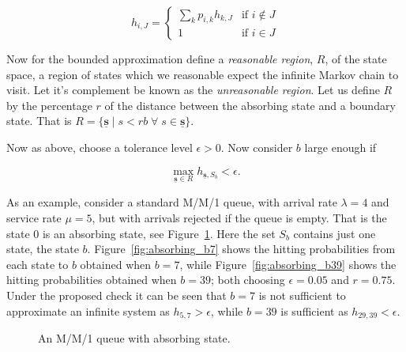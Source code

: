 \documentclass{article}
\begin{document}
\begin{equation}
h_{i, J} = \begin{cases}
\sum_k p_{i, k} h_{k, J} & \text{if } i \notin J \\
1 & \text{if } i \in J
\end{cases}
\end{equation}

Now for the bounded approximation define a \textit{reasonable region}, $R$, of
the state space, a region of states which we reasonable expect the infinite
Markov chain to visit. Let it's complement be known as the \textit{unreasonable
region}.
Let us define $R$ by the percentage $r$ of the distance between the absorbing
state and a boundary state. That is
$R = \{\underline{\mathbf{s}} \;|\; s < rb \;\forall\; s \in \underline{\mathbf{s}}\}$.

Now as above, choose a tolerance level $\epsilon > 0$. Now consider $b$ large
enough if

\begin{equation}
\max_{\underline{\mathbf{s}} \in R} h_{\underline{\mathbf{s}}, S_b} < \epsilon.
\end{equation}

As an example, consider a standard M/M/1 queue, with arrival rate $\lambda = 4$
and service rate $\mu = 5$, but with arrivals rejected if the queue is empty.
That is the state $0$ is an absorbing state, see Figure~\ref{fig:mm1_absorbing}.
Here the set $S_b$ contains just one state, the state $b$.
Figure~\ref{fig:absorbing_b7} shows the hitting probabilities from each state to
$b$ obtained when $b=7$, while Figure~\ref{fig:absorbing_b39} shows the hitting
probabilities obtained when $b=39$; both choosing $\epsilon=0.05$ and $r=0.75$.
Under the proposed check it can be seen that $b=7$ is not sufficient to
approximate an infinite system as $h_{5,7} > \epsilon$, while $b=39$ is sufficient
as $h_{29, 39} < \epsilon$.

\begin{figure}

\caption{An M/M/1 queue with absorbing state.}
\label{fig:mm1_absorbing}
\end{figure}
\end{document}
